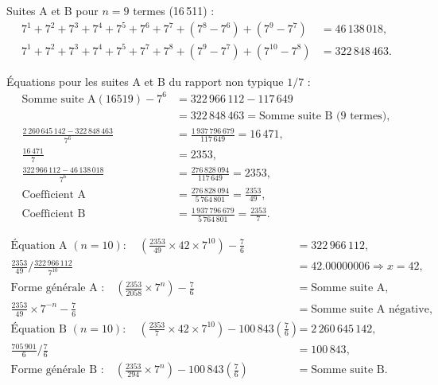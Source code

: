 \documentclass[11pt,a4paper]{article}
\begin{document}
Suites A et B pour $n = 9$ termes (16\,511) :
\begin{align*}
7^{1}+7^{2}+7^{3}+7^{4}+7^{5}+7^{6}+7^{7}+(7^{8}-7^{6})+(7^{9}-7^{7}) &= 46\,138\,018,\\
7^{1}+7^{2}+7^{3}+7^{4}+7^{5}+7^{7}+7^{8}+(7^{9}-7^{7})+(7^{10}-7^{8}) &= 322\,848\,463.
\end{align*}

Équations pour les suites A et B du rapport non typique $1/7$ :
\begin{align*}
\text{Somme suite A}(16519)-7^{6}
&=322\,966\,112-117\,649\\
&=322\,848\,463=\text{Somme suite B (9 termes)},\\
\frac{2\,260\,645\,142-322\,848\,463}{7^{6}}
&=\frac{1\,937\,796\,679}{117\,649}=16\,471,\\
\frac{16\,471}{7} &=2353,\\
\frac{322\,966\,112-46\,138\,018}{7^{6}}
&=\frac{276\,828\,094}{117\,649}=2353,\\
\text{Coefficient A}
&=\frac{276\,828\,094}{5\,764\,801}=\frac{2353}{49},\\
\text{Coefficient B}
&=\frac{1\,937\,796\,679}{5\,764\,801}=\frac{2353}{7}.
\end{align*}

\begin{boiteformule}
\begin{align*}
\text{Équation A }(n=10):\quad
\left(\frac{2353}{49}\times42\times7^{10}\right)-\frac{7}{6}
&=322\,966\,112,\\
\frac{2353}{49}\Big/\frac{322\,966\,112}{7^{10}}
&=42.00000006\Rightarrow x=42,\\
\text{Forme générale A :}\quad
\left(\frac{2353}{2058}\times7^{n}\right)-\frac{7}{6}
&=\text{Somme suite A},\\
\frac{2353}{49}\times7^{-n}-\frac{7}{6}
&=\text{Somme suite A négative},\\
\text{Équation B }(n=10):\quad
\left(\frac{2353}{7}\times42\times7^{10}\right)
-100\,843\left(\frac{7}{6}\right)
&=2\,260\,645\,142,\\
\frac{705\,901}{6}\Big/\frac{7}{6} &=100\,843,\\
\text{Forme générale B :}\quad
\left(\frac{2353}{294}\times7^{n}\right)
-100\,843\left(\frac{7}{6}\right)
&=\text{Somme suite B}.
\end{align*}
\end{boiteformule}

\end{document}
